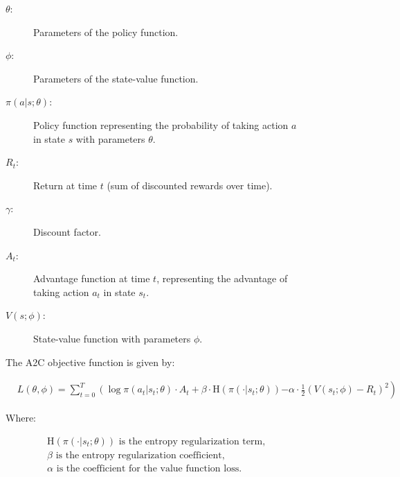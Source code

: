 \documentclass[lettersize,journal]{IEEEtran}
\begin{document}
\begin{figure}[!t]
  \normalsize %
  \begin{description}
    \item[$\theta$:] Parameters of the policy function.
    \item[$\phi$:] Parameters of the state-value function.
    \item[$\pi(a|s;\theta)$:] Policy function representing the probability of taking action $a$ in state $s$ with parameters $\theta$.
    \item[$R_t$:] Return at time $t$ (sum of discounted rewards over time).
    \item[$\gamma$:] Discount factor.
    \item[$A_t$:] Advantage function at time $t$, representing the advantage of taking action $a_t$ in state $s_t$.
    \item[$V(s;\phi)$:] State-value function with parameters $\phi$.
  \end{description}
  


  The A2C objective function is given by:


  \begin{align}
  &L(\theta, \phi) = \sum_{t=0}^{T} \left( \log \pi(a_t|s_t;\theta) \cdot A_t + \beta \cdot \text{H}(\pi(\cdot|s_t;\theta)) \right. \left. - \alpha \cdot \frac{1}{2} (V(s_t;\phi) - R_t)^2 \right)
\end{align}


  Where:

  \begin{align}
  &\text{H}(\pi(\cdot|s_t;\theta)) \text{ is the entropy regularization term,} \\
  &\beta \text{ is the entropy regularization coefficient,} \\
  &\alpha \text{ is the coefficient for the value function loss.}
  \end{align}
  \end{figure}

\end{document}

